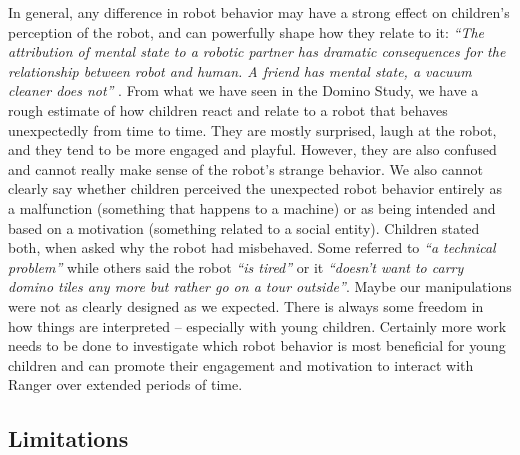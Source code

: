 \documentclass{sig-alternate}
\begin{document}
In general, any difference in robot behavior may have a strong effect on
children's perception of the robot, and can powerfully shape how they relate to
it: \textit{``The attribution of mental state to a robotic partner has dramatic
consequences for the relationship between robot and human. A friend has mental
state, a vacuum cleaner does not''} \cite[p.~225]{short_no_2010}.  From what we
have seen in the Domino Study, we have a rough estimate of how children react
and relate to a robot that behaves unexpectedly from time to time. They are
mostly surprised, laugh at the robot, and they tend to be more engaged and
playful. However, they are also confused and cannot really make sense of the
robot's strange behavior. We also cannot clearly say whether children perceived
the unexpected robot behavior entirely as a malfunction (something that happens
to a machine) or as being intended and based on a motivation (something related
to a social entity). Children stated both, when asked why the robot had
misbehaved. Some referred to \textit{``a technical problem''} while others said
the robot \textit{``is tired''} or it \textit{``doesn't want to carry domino
tiles any more but rather go on a tour outside''}. Maybe our manipulations were
not as clearly designed as we expected. There is always some freedom in how
things are interpreted -- especially with young children.  Certainly more work
needs to be done to investigate which robot behavior is most beneficial for
young children and can promote their engagement and motivation to interact with
Ranger over extended periods of time.  




\subsection{Limitations}
\end{document}
